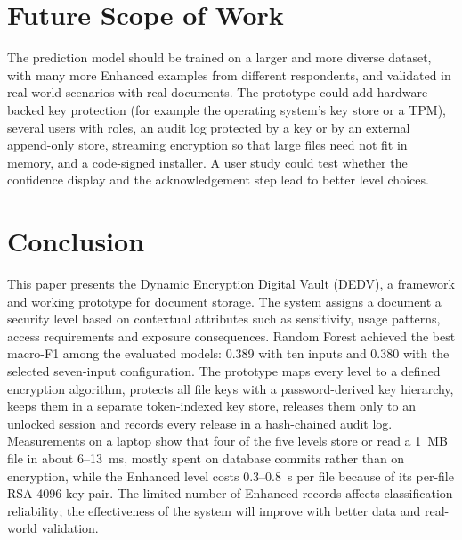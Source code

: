 \documentclass[pdflatex,sn-mathphys-num]{sn-jnl}
\begin{document}
\section{Future Scope of Work}\label{sec10}

The prediction model should be trained on a larger and more diverse dataset, with many more
Enhanced examples from different respondents, and validated in real-world scenarios with real
documents. The prototype could add hardware-backed key protection (for example the operating
system's key store or a TPM), several users with roles, an audit log protected by a key or by an
external append-only store, streaming encryption so that large files need not fit in memory, and
a code-signed installer. A user study could test whether the confidence display and the
acknowledgement step lead to better level choices.

\section{Conclusion}\label{sec11}

This paper presents the Dynamic Encryption Digital Vault (DEDV), a framework and working prototype
for document storage. The system assigns a document a security level based on contextual
attributes such as sensitivity, usage patterns, access requirements and exposure consequences.
Random Forest achieved the best macro-F1 among the evaluated models: 0.389 with ten inputs and
0.380 with the selected seven-input configuration. The prototype maps every level to a defined
encryption algorithm, protects all file keys with a password-derived key hierarchy, keeps them in a
separate token-indexed key store, releases them only to an unlocked session and records every
release in a hash-chained audit log. Measurements on a laptop show that four of the five levels
store or read a 1~MB file in about 6--13~ms, mostly spent on database commits rather than on
encryption, while the Enhanced level costs 0.3--0.8~s per file because of its per-file RSA-4096 key
pair. The limited number of Enhanced records
affects classification reliability; the effectiveness of the system will improve with better data
and real-world validation.


\end{document}
